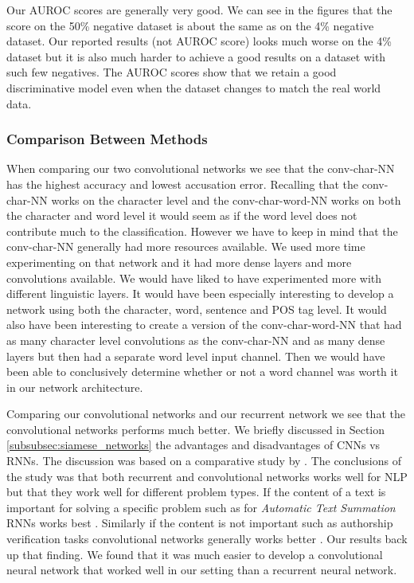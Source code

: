 Our \gls{AUROC} scores are generally very good. We can see in the figures that
the score on the 50\% negative dataset is about the same as on the
4\% negative dataset. Our reported results (not \gls{AUROC} score) looks much
worse on the 4\% dataset but it is also much harder to achieve a good results on
a dataset with such few negatives. The \gls{AUROC} scores show that we retain a
good discriminative model even when the dataset changes to match the real world
data.


\subsubsection{Comparison Between Methods}

When comparing our two convolutional networks we see that the \gls{conv-char-NN}
has the highest accuracy and lowest accusation error. Recalling that the
\gls{conv-char-NN} works on the character level and the \gls{conv-char-word-NN}
works on both the character and word level it would seem as if the word level
does not contribute much to the classification. However we have to keep in
mind that the \gls{conv-char-NN} generally had more resources available. We
used more time experimenting on that network and it had more dense layers and
more convolutions available. We would have liked to have experimented more
with different linguistic layers. It would have been especially interesting
to develop a network using both the character, word, sentence and \gls{POS}
tag level. It would also have been interesting to create a version of the
\gls{conv-char-word-NN} that had as many character level convolutions as the
\gls{conv-char-NN} and as many dense layers but then had a separate word level
input channel. Then we would have been able to conclusively determine whether or
not a word channel was worth it in our network architecture.

Comparing our convolutional networks and our recurrent network we see that
the convolutional networks performs much better. We briefly discussed in
Section \ref{subsubsec:siamese_networks} the advantages and disadvantages of
\glspl{CNN} vs \glspl{RNN}. The discussion was based on a comparative study by
\citep{DBLP:journals/corr/0001KYS17}. The conclusions of the study was that both
recurrent and convolutional networks works well for \gls{NLP} but that they
work well for different problem types. If the content of a text is important
for solving a specific problem such as for \textit{Automatic Text Summation}
\glspl{RNN} works best \citep{DBLP:journals/corr/ZengLFU16}. Similarly if the
content is not important such as authorship verification tasks convolutional
networks generally works better \citep{DBLP:journals/corr/0001KYS17}. Our
results back up that finding. We found that it was much easier to develop a
convolutional neural network that worked well in our setting than a recurrent
neural network.



